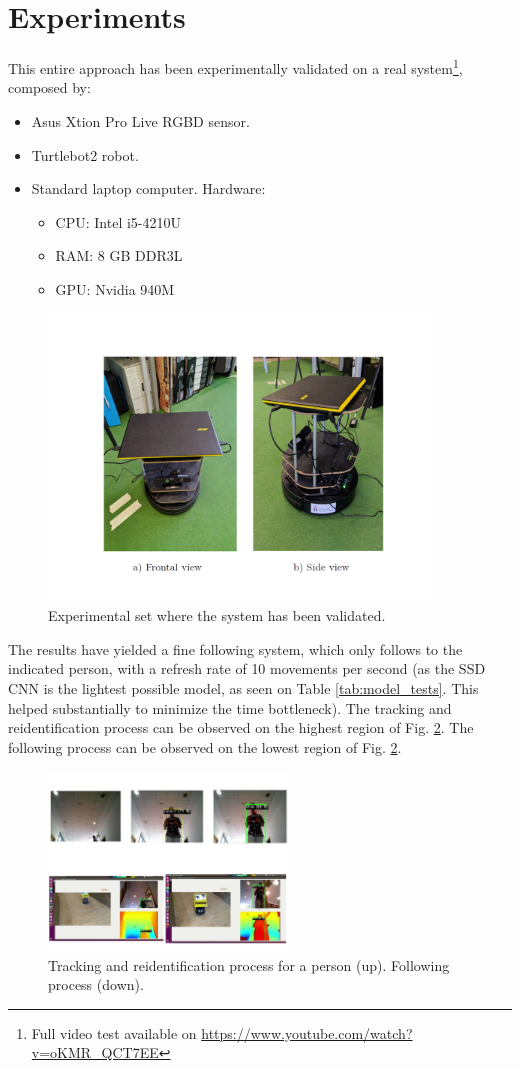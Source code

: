 \section{Experiments}
\label{sec:experiments}

This entire approach has been experimentally validated on a real system\footnote{Full video test available on \url{https://www.youtube.com/watch?v=oKMR_QCT7EE}}, composed by:

\begin{itemize}
	\item Asus Xtion Pro Live RGBD sensor.
	\item Turtlebot2 robot.
	\item Standard laptop computer. Hardware:
	\begin{itemize}
		\item CPU: Intel i5-4210U
		\item RAM: 8 GB DDR3L
		\item GPU: Nvidia 940M
	\end{itemize}
\end{itemize}

\begin{figure}[h]
	\centering
	\includegraphics[width=4in]{images/exp_set}
	\caption{Experimental set where the system has been validated.}
	\label{fig:exp_set}
\end{figure}






The results have yielded a fine following system, which only follows to the indicated person, with a refresh rate of 10 movements per second (as the SSD CNN is the lightest possible model, as seen on Table \ref{tab:model_tests}. This helped substantially to minimize the time bottleneck). The tracking and reidentification process can be observed on the highest region of Fig. \ref{fig:exp_figures}. The following process can be observed on the lowest region of Fig. \ref{fig:exp_figures}.

\begin{figure}[h]
	\centering
	\includegraphics[width=2.5in]{images/exp_figures}
	\caption{Tracking and reidentification process for a person (up). Following process (down).}
	\label{fig:exp_figures}
\end{figure}